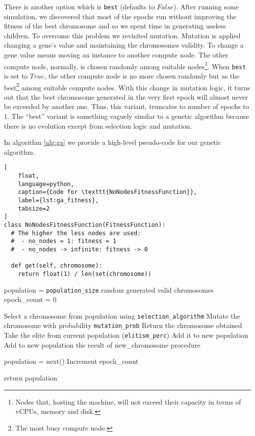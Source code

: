 There is another option which is \texttt{best} (defaults to $False$). After running some simulation, we discovered that most of the epochs run without improving the fitness of the best chromosome and so we spent time in generating useless children. To overcome this problem we revisited mutation. Mutation is applied changing a gene's value and maintaining the chromosomes validity. To change a gene value means moving an instance to another compute node. The other compute node, normally, is chosen randomly among suitable nodes\footnote{Nodes that, hosting the machine, will not exceed their capacity in terms of vCPUs, memory and disk.}. When \texttt{best} is set to $True$, the other compute node is no more chosen randomly but as the best\footnote{The most busy compute node.} among suitable compute nodes. With this change in mutation logic, it turns out that the best chromosome generated in the very first epoch will almost never be exceeded by another one. Thus, this variant, truncates to number of epochs to $1$. The ``best'' variant is something vaguely similar to a genetic algorithm because there is no evolution except from selection logic and mutation.

In algorithm \ref{alg:ga} we provide a high-level pseudo-code for our genetic algorithm.

\begin{lstlisting}[
	float,
	language=python,
	caption={Code for \texttt{NoNodesFitnessFunction}},
	label={lst:ga_fitness},
	tabsize=2
]
class NoNodesFitnessFunction(FitnessFunction):
  # The higher the less nodes are used:
  #  - no_nodes = 1: fitness = 1
  #  - no_nodes -> infinite: fitness -> 0

  def get(self, chromosome):
    return float(1) / len(set(chromosome))
\end{lstlisting}

\begin{algorithm}[H]
\caption{Pseudo-code for our genetic algorithm}
\label{alg:ga}
\begin{algorithmic}[0]
	\State population = \texttt{population\_size} random generated valid chromosomes
	\State epoch\_count = 0
	\State

		\State Select a chromosome from population using \texttt{selection\_algorithm}
		\State Mutate the chromosome with probability \texttt{mutation\_prob}
		\State Return the chromosome obtained
	\EndProcedure
	\State
		\State Take the elite from current population (\texttt{elitism\_perc})
		\State Add it to new population
			\State Add to new population the result of new\_chromosome procedure
		\EndWhile
	\EndProcedure
	\State

		\State population = next()
		\State Increment epoch\_count
	\EndWhile

	\State
	\State return population
\end{algorithmic}
\end{algorithm}

